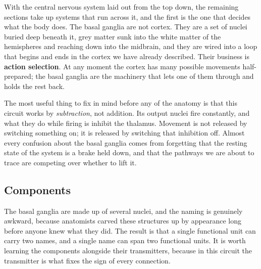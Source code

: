 \documentclass[11pt]{article}
\begin{document}
With the central nervous system laid out from the top down, the remaining sections take up systems that run across it, and the first is the one that decides what the body does. The basal ganglia are not cortex. They are a set of nuclei buried deep beneath it, grey matter sunk into the white matter of the hemispheres and reaching down into the midbrain, and they are wired into a loop that begins and ends in the cortex we have already described. Their business is \textbf{action selection}. At any moment the cortex has many possible movements half-prepared; the basal ganglia are the machinery that lets one of them through and holds the rest back.

The most useful thing to fix in mind before any of the anatomy is that this circuit works by \textit{subtraction}, not addition. Its output nuclei fire constantly, and what they do while firing is inhibit the thalamus. Movement is not released by switching something on; it is released by switching that inhibition off. Almost every confusion about the basal ganglia comes from forgetting that the resting state of the system is a brake held down, and that the pathways we are about to trace are competing over whether to lift it.

\subsection{Components}

The basal ganglia are made up of several nuclei, and the naming is genuinely awkward, because anatomists carved these structures up by appearance long before anyone knew what they did. The result is that a single functional unit can carry two names, and a single name can span two functional units. It is worth learning the components alongside their transmitters, because in this circuit the transmitter is what fixes the sign of every connection.
\end{document}
